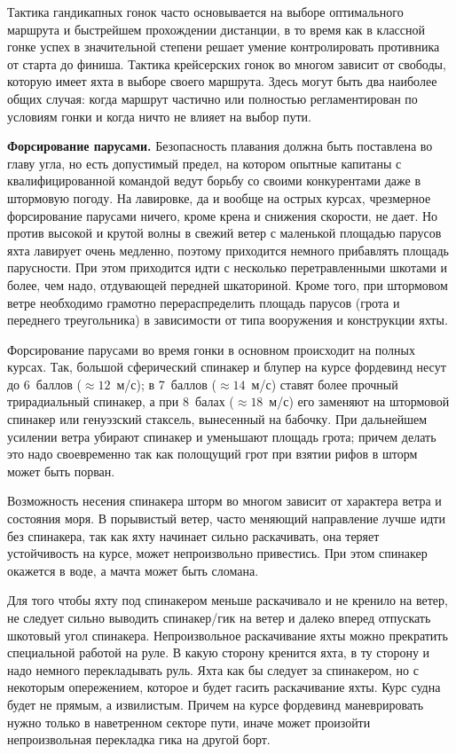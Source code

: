 Тактика гандикапных гонок часто основывается на выборе оптимального маршрута и быстрейшем прохождении дистанции, в то время как в классной гонке успех в значительной степени решает умение контролировать противника от старта до финиша. Тактика крейсерских гонок во многом зависит от свободы, которую имеет яхта в выборе своего маршрута. Здесь могут быть два наиболее общих случая: когда маршрут частично или полностью регламентирован по условиям гонки и когда ничто не влияет на выбор пути. 

\textbf{Форсирование парусами.} Безопасность плавания должна быть поставлена во главу угла, но есть допустимый предел, на котором опытные капитаны с квалифицированной командой ведут борьбу со своими конкурентами даже в штормовую погоду. На лавировке, да и вообще на острых курсах, чрезмерное форсирование парусами ничего, кроме крена и снижения скорости, не дает. Но против высокой и крутой волны в свежий ветер с маленькой площадью парусов яхта лавирует очень медленно, поэтому приходится немного прибавлять площадь парусности. При этом приходится идти с несколько перетравленными шкотами и более, чем надо, отдувающей передней шкаториной. Кроме того, при штормовом ветре необходимо грамотно перераспределить площадь парусов (грота и переднего треугольника) в зависимости от типа вооружения и конструкции яхты.

Форсирование парусами во время гонки в основном происходит на полных курсах. Так, большой сферический спинакер и блупер на курсе фордевинд несут до 6~баллов ($\approx 12$~м/с); в 7~баллов ($\approx 14$~м/с) ставят более прочный трирадиальный спинакер, а при 8~балах ($\approx 18$~м/с) его заменяют на штормовой спинакер или генуэзский стаксель, вынесенный на бабочку. При дальнейшем усилении ветра убирают спинакер и уменьшают площадь грота; причем делать это надо своевременно так как полощущий грот при взятии рифов в шторм может быть порван.

Возможность несения спинакера шторм во многом зависит от характера ветра и состояния моря. В порывистый ветер, часто меняющий направление лучше идти без спинакера, так как яхту начинает сильно раскачивать, она теряет устойчивость на курсе, может непроизвольно привестись. При этом спинакер окажется в воде, а мачта может быть сломана.

Для того чтобы яхту под спинакером меньше раскачивало и не кренило на ветер, не следует сильно выводить спинакер\-/гик на ветер и далеко вперед отпускать шкотовый угол спинакера. Непроизвольное раскачивание яхты можно прекратить специальной работой на руле. В какую сторону кренится яхта, в ту сторону и надо немного перекладывать руль. Яхта как бы следует за спинакером, но с некоторым опережением, которое и будет гасить раскачивание яхты. Курс судна будет не прямым, а извилистым. Причем на курсе фордевинд маневрировать нужно только в наветренном секторе пути, иначе может произойти непроизвольная перекладка гика на другой борт.

